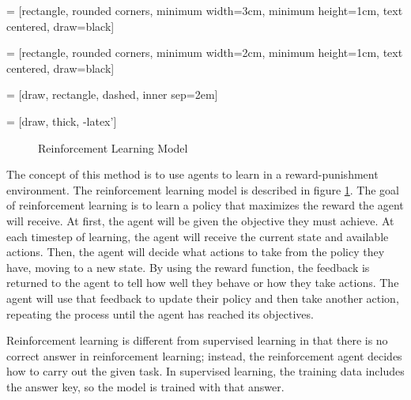  = [rectangle, rounded corners, 
minimum width=3cm, 
minimum height=1cm,
text centered, 
draw=black]

 = [rectangle, rounded corners, 
minimum width=2cm, 
minimum height=1cm,
text centered, 
draw=black]

 = [draw, rectangle, dashed, inner sep=2em]

 = [draw, thick, -latex']

\begin{figure}
  \centering
  
  \caption{Reinforcement Learning Model}
  \label{fig:rl-flow}
\end{figure}

The concept of this method is to use agents to learn in a reward-punishment environment. The reinforcement learning model is described in figure \ref{fig:rl-flow}. The goal of reinforcement learning is to learn a policy that maximizes the reward the agent will receive. At first, the agent will be given the objective they must achieve. At each timestep of learning, the agent will receive the current state and available actions. Then, the agent will decide what actions to take from the policy they have, moving to a new state. By using the reward function, the feedback is returned to the agent to tell how well they behave or how they take actions. The agent will use that feedback to update their policy and then take another action, repeating the process until the agent has reached its objectives.

Reinforcement learning is different from supervised learning in that there is no correct answer in reinforcement learning; instead, the reinforcement agent decides how to carry out the given task. In supervised learning, the training data includes the answer key, so the model is trained with that answer.
 
